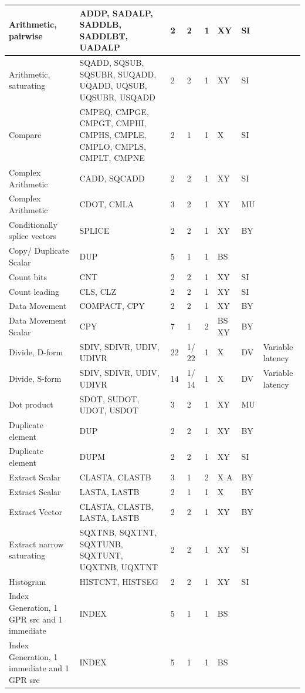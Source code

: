 \begin{longtable}{|p{1in}|p{1in}|l|l|l|p{1in}|l|p{1in}|}
\hline
Arithmetic, pairwise & ADDP, SADALP, SADDLB, SADDLBT, UADALP & 2 & 2 & 1 & XY & SI & \\
\hline
Arithmetic, saturating & SQADD, SQSUB, SQSUBR, SUQADD, UQADD, UQSUB, UQSUBR, USQADD & 2 & 2 & 1 & XY & SI & \\
\hline
Compare & CMPEQ, CMPGE, CMPGT, CMPHI, CMPHS, CMPLE, CMPLO, CMPLS, CMPLT, CMPNE & 2 & 1 & 1 & X & SI & \\
\hline
Complex Arithmetic & CADD, SQCADD & 2 & 2 & 1 & XY & SI & \\
\hline
Complex Arithmetic & CDOT, CMLA & 3 & 2 & 1 & XY & MU & \\
\hline
Conditionally splice vectors & SPLICE & 2 & 2 & 1 & XY & BY & \\
\hline
Copy/ Duplicate Scalar & DUP & 5 & 1 & 1 & BS &  & \\
\hline
Count bits & CNT & 2 & 2 & 1 & XY & SI & \\
\hline
Count leading & CLS, CLZ & 2 & 2 & 1 & XY & SI & \\
\hline
Data Movement & COMPACT, CPY & 2 & 2 & 1 & XY & BY & \\
\hline
Data Movement Scalar & CPY & 7 & 1 & 2 & BS XY & BY & \\
\hline
Divide, D-form & SDIV, SDIVR, UDIV, UDIVR & 22 & 1/ 22 & 1 & X & DV & Variable latency\\
\hline
Divide, S-form & SDIV, SDIVR, UDIV, UDIVR & 14 & 1/ 14 & 1 & X & DV & Variable latency\\
\hline
Dot product & SDOT, SUDOT, UDOT, USDOT & 3 & 2 & 1 & XY & MU & \\
\hline
Duplicate element & DUP & 2 & 2 & 1 & XY & BY & \\
\hline
Duplicate element & DUPM & 2 & 2 & 1 & XY & SI & \\
\hline
Extract Scalar & CLASTA, CLASTB & 3 & 1 & 2 & X A & BY & \\
\hline
Extract Scalar & LASTA, LASTB & 2 & 1 & 1 & X & BY & \\
\hline
Extract Vector & CLASTA, CLASTB, LASTA, LASTB & 2 & 2 & 1 & XY & BY & \\
\hline
Extract narrow saturating & SQXTNB, SQXTNT, SQXTUNB, SQXTUNT, UQXTNB, UQXTNT & 2 & 2 & 1 & XY & SI & \\
\hline
Histogram & HISTCNT, HISTSEG & 2 & 2 & 1 & XY & SI & \\
\hline
Index Generation, 1 GPR src and 1 immediate & INDEX & 5 & 1 & 1 & BS &  & \\
\hline
Index Generation, 1 immediate and 1 GPR src & INDEX & 5 & 1 & 1 & BS &  & \\

\end{longtable}
